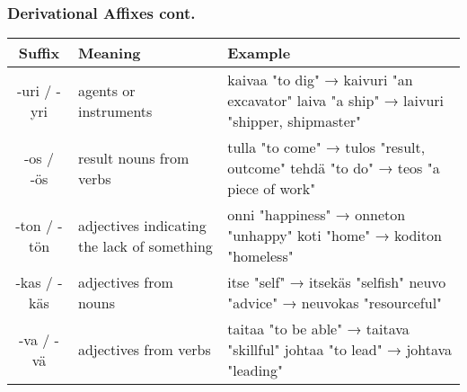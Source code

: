 \documentclass{beamer}
\begin{document}
\begin{frame}
	\frametitle{Derivational Affixes cont.}
    {\scriptsize
    \begin{center}
        \begin{tabular}{|c|p{3cm}|p{5cm}|}
            \hline
            \textbf{Suffix} & \textbf{Meaning} & \textbf{Example}\\\hline
            -uri / -yri &
                agents or instruments &
                kaivaa "to dig" → kaivuri "an excavator" \newline
                laiva "a ship" → laivuri "shipper, shipmaster" \\\hline
            -os / -ös &
                result nouns from verbs &
                tulla "to come" → tulos "result, outcome" \newline
                tehd\"a "to do" → teos "a piece of work" \\\hline
            -ton / -tön &
                adjectives indicating the lack of something &
                onni "happiness" → onneton "unhappy" \newline
                koti "home" → koditon "homeless" \\\hline
            -kas / -k\"as &
                adjectives from nouns &
                itse "self" → itsek\"as "selfish" \newline
                neuvo "advice" → neuvokas "resourceful" \\\hline
            -va / -v\"a &
                adjectives from verbs &
                taitaa "to be able" → taitava "skillful" \newline
                johtaa "to lead" → johtava "leading" \\\hline
        \end{tabular}
    \end{center}
    }
\end{frame}
\end{document}
